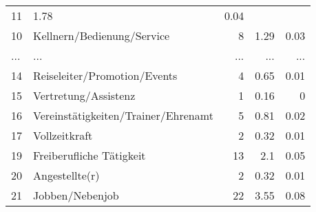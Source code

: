 \begin{longtable}{lXrrr}
          \num{11} &
          \num[round-mode=places,round-precision=2]{1.78} &
          \num[round-mode=places,round-precision=2]{0.04} \\
        10 & \multicolumn{1}{X}{Kellnern/Bedienung/Service} & %
          \num{8} &
          \num[round-mode=places,round-precision=2]{1.29} &
          \num[round-mode=places,round-precision=2]{0.03} \\
       ... & ... & ... & ... & ... \\
        14 & \multicolumn{1}{X}{Reiseleiter/Promotion/Events} & %
          \num{4} &
          \num[round-mode=places,round-precision=2]{0.65} &
          \num[round-mode=places,round-precision=2]{0.01} \\

        15 & \multicolumn{1}{X}{Vertretung/Assistenz} & %
          \num{1} &
          \num[round-mode=places,round-precision=2]{0.16} &
          \num[round-mode=places,round-precision=2]{0} \\

        16 & \multicolumn{1}{X}{Vereinstätigkeiten/Trainer/Ehrenamt} & %
          \num{5} &
          \num[round-mode=places,round-precision=2]{0.81} &
          \num[round-mode=places,round-precision=2]{0.02} \\

        17 & \multicolumn{1}{X}{Vollzeitkraft} & %
          \num{2} &
          \num[round-mode=places,round-precision=2]{0.32} &
          \num[round-mode=places,round-precision=2]{0.01} \\

        19 & \multicolumn{1}{X}{Freiberufliche Tätigkeit} & %
          \num{13} &
          \num[round-mode=places,round-precision=2]{2.1} &
          \num[round-mode=places,round-precision=2]{0.05} \\

        20 & \multicolumn{1}{X}{Angestellte(r)} & %
          \num{2} &
          \num[round-mode=places,round-precision=2]{0.32} &
          \num[round-mode=places,round-precision=2]{0.01} \\

        21 & \multicolumn{1}{X}{Jobben/Nebenjob} & %
          \num{22} &
          \num[round-mode=places,round-precision=2]{3.55} &
          \num[round-mode=places,round-precision=2]{0.08} \\


\end{longtable}
